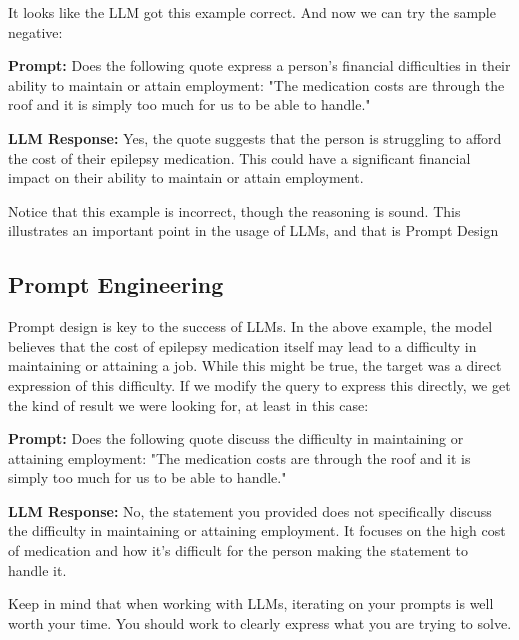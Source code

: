 It looks like the LLM got this example correct. And now we can try the sample negative:

\begin{displayquote}
  \textbf{Prompt:} Does the following quote express a person's financial difficulties in their ability to maintain or attain employment: "The medication costs are through the roof and it is simply too much for us to be able to handle."
\end{displayquote}

\begin{displayquote}
  \textbf{LLM Response:} Yes, the quote suggests that the person is struggling to afford the cost of their epilepsy medication. This could have a significant financial impact on their ability to maintain or attain employment.
\end{displayquote}

Notice that this example is incorrect, though the reasoning is sound. This illustrates an important point in the usage of LLMs, and that is Prompt Design

\subsection{Prompt Engineering}

Prompt design is key to the success of LLMs. In the above example, the model believes that the cost of epilepsy medication itself may lead to a difficulty in maintaining or attaining a job. While this might be true, the target was a direct expression of this difficulty.
If we modify the query to express this directly, we get the kind of result we were looking for, at least in this case:

\begin{displayquote}
  \textbf{Prompt:} Does the following quote discuss the difficulty in maintaining or attaining employment: "The medication costs are through the roof and it is simply too much for us to be able to handle."
\end{displayquote}

\begin{displayquote}
  \textbf{LLM Response:} No, the statement you provided does not specifically discuss the difficulty in maintaining or attaining employment. It focuses on the high cost of medication and how it's difficult for the person making the statement to handle it.
\end{displayquote}

Keep in mind that when working with LLMs, iterating on your prompts is well worth your time. You should work to clearly express what you are trying to solve.

